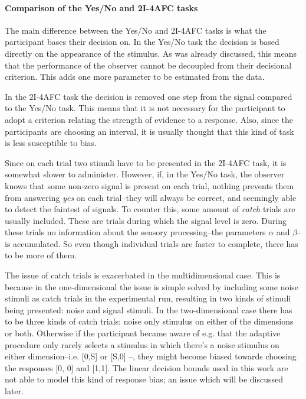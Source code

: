 \documentclass{article}\usepackage{knitr}
\begin{document}
\paragraph{Comparison of the Yes/No and 2I-4AFC tasks}

The main difference between the Yes/No and 2I-4AFC tasks is what the participant bases their decision on. In the Yes/No task the decision is based directly on the appearance of the stimulus. As was already discussed, this means that the performance of the observer cannot be decoupled from their decisional criterion. This adds one more parameter to be estimated from the data. 

In the 2I-4AFC task the decision is removed one step from the signal compared to the Yes/No task. This means that it is not necessary for the participant to adopt a criterion relating the strength of evidence to a response. Also, since the participants are choosing an interval, it is usually thought that this kind of task is less susceptible to bias.

Since on each trial two stimuli have to be presented in the 2I-4AFC task, it is somewhat slower to administer. However, if, in the Yes/No task, the observer knows that some non-zero signal is present on each trial, nothing prevents them from answering \textit{yes} on each trial--they will always be correct, and seemingly able to detect the faintest of signals. To counter this, some amount of \textit{catch} trials are usually included. These are trials during which the signal level is zero. During these trials no information about the sensory processing--the parameters $\alpha$ and $\beta$--is accumulated. So even though individual trials are faster to complete, there has to be more of them. 

The issue of catch trials is exacerbated in the multidimensional case. This is because in the one-dimensional the issue is simple solved by including some noise stimuli as catch trials in the experimental run, resulting in two kinds of stimuli being presented: noise and signal stimuli. In the two-dimensional case there has to be three kinds of catch trials: noise only stimulus on either of the dimensions or both. Otherwise if the participant became aware of e.g. that the adaptive procedure only rarely selects a stimulus in which there's a noise stimulus on either dimension--i.e. [0,S] or [S,0] --, they might become biased towards choosing the responses [0, 0] and [1,1]. The linear decision bounds used in this work are not able to model this kind of response bias; an issue which will be discussed later. 
\end{document}

